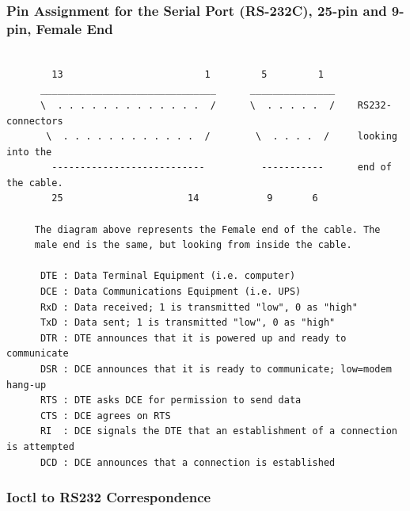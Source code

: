 {{{{{{{{{{\begin{longtable}{llll}
\end{longtable}

\label{Pin-Assignment-for-the-Serial-Port-_005bRS_002d232C_005d_003b-25_002dpi%
n-and-9_002dpin_003b-Female-End}

\subsubsection*{Pin Assignment for the Serial Port (RS-232C), 25-pin and
9-pin, Female End}

\label{index-Cables-217}

\footnotesize
\begin{verbatim}
     
        13                         1         5         1
      _______________________________      _______________
      \  . . . . . . . . . . . . .  /      \  . . . . .  /    RS232-connectors
       \  . . . . . . . . . . . .  /        \  . . . .  /     looking into the
        ---------------------------          -----------      end of the cable.
        25                      14            9       6
     
     The diagram above represents the Female end of the cable. The
     male end is the same, but looking from inside the cable.
     
      DTE : Data Terminal Equipment (i.e. computer)
      DCE : Data Communications Equipment (i.e. UPS)
      RxD : Data received; 1 is transmitted "low", 0 as "high"
      TxD : Data sent; 1 is transmitted "low", 0 as "high"
      DTR : DTE announces that it is powered up and ready to communicate
      DSR : DCE announces that it is ready to communicate; low=modem hang-up
      RTS : DTE asks DCE for permission to send data
      CTS : DCE agrees on RTS
      RI  : DCE signals the DTE that an establishment of a connection is attempted
      DCD : DCE announces that a connection is established
\end{verbatim}
\normalsize

\label{Ioctl-to-RS232-Correspondence}

\subsubsection*{Ioctl to RS232 Correspondence}

}}}}}}}}}}
